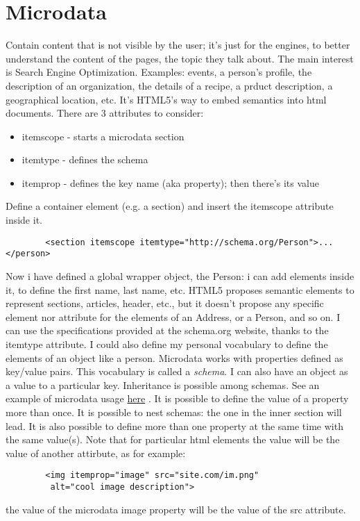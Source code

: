 \documentclass[a4paper,11pt]{book}
\begin{document}
\chapter{Microdata}
    Contain content that is not visible by the user; it's just for the engines, to better understand the content
    of the pages, the topic they talk about. The main interest is Search Engine Optimization.
    Examples: events, a person's profile, the description of an organization, the details of a recipe, a prduct
    description, a geographical location, etc. It's HTML5's way to embed semantics into html documents.
    There are 3 attributes to consider:
    \begin{itemize}
        \item itemscope - starts a microdata section
        \item itemtype  - defines the schema
        \item itemprop  - defines the key name (aka property); then there's its value
    \end{itemize}
    Define a container element (e.g. a section) and insert the itemscope attribute inside it.
    \begin{verbatim}
        <section itemscope itemtype="http://schema.org/Person">...</person>
    \end{verbatim}
    Now i have defined a global wrapper object, the Person: i can add elements inside it, to define the first name,
    last name, etc. HTML5 proposes semantic elements to represent sections, articles, header, etc., but it doesn't
    propose any specific element nor attribute for the elements of an Address, or a Person, and so on. I can use
    the specifications provided at the schema.org website, thanks to the itemtype attribute. I could also define
    my personal vocabulary to define the elements of an object like a person. Microdata works with properties defined
    as key/value pairs. This vocabulary is called a \emph{schema}. I can also have an object as a value to a particular
    key. Inheritance is possible among schemas. See an example of microdata usage
    \href{http://pdata.altervista.org/HTML5/microdata/microdata.html}{here} . It is possible to define the value of a property
    more than once. It is possible to nest schemas: the one in the inner section will lead. It is also possible to
    define more than one property at the same time with the same value(s). Note that for particular html elements
    the value will be the value of another attirbute, as for example:
    \begin{verbatim}
        <img itemprop="image" src="site.com/im.png"
         alt="cool image description">
    \end{verbatim}
    the value of the microdata image property will be the value of the src attribute.
    
\end{document}
